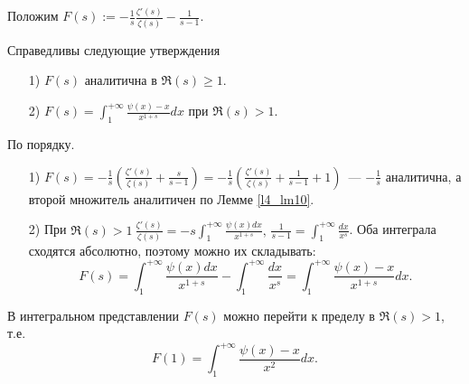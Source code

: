 Положим $\displaystyle F(s) := -\frac{1}{s}\frac{\zeta'(s)}{\zeta(s)} - \frac{1}{s-1}$.\\
\begin{lemma} \label{l2_lm11}
	Справедливы следующие утверждения
	\begin{enumerate}[nolistsep]
		\item[1)] $F(s)$ аналитична в $\Re(s) \geq 1$.
		\item[2)] $\displaystyle F(s) = \int_1^{+\infty} \frac{\psi(x)-x}{x^{1+s}}dx$ при $\Re(s) > 1$.
	\end{enumerate}
\end{lemma}
\begin{pf}
	По порядку.
	\begin{enumerate}[nolistsep]
		\item[1)] $\displaystyle F(s) = -\frac{1}{s}\left( \frac{\zeta'(s)}{\zeta(s)} + \frac{s}{s-1} \right) = -\frac{1}{s}\left( \frac{\zeta'(s)}{\zeta(s)} + \frac{1}{s-1} +1 \right)$ — $\displaystyle -\frac{1}{s}$ аналитична, а второй множитель аналитичен по Лемме \ref{l4_lm10}.
		\item[2)] При $\displaystyle \Re(s)>1 \ \frac{\zeta'(s)}{\zeta(s)} = -s\int_1^{+\infty} \frac{\psi(x)dx}{x^{1+s}}, \, \frac{1}{s-1}=\int_1^{+\infty}\frac{dx}{x^s}$. Оба интеграла сходятся абсолютно, поэтому можно их складывать:
			$$F(s) = \int_1^{+\infty}\frac{\psi(x)dx}{x^{1+s}} - \int_1^{+\infty} \frac{dx}{x^s} = \int_1^{+\infty} \frac{\psi(x)-x}{x^{1+s}}dx.$$
	\end{enumerate}
\end{pf}

\begin{theorem} \label{l4_thm7}
	В интегральном представлении $F(s)$ можно перейти к пределу в $\Re(s)>1$, т.е.
	$$F(1) = \int_1^{+\infty} \frac{\psi(x)-x}{x^2}dx.$$
\end{theorem}

